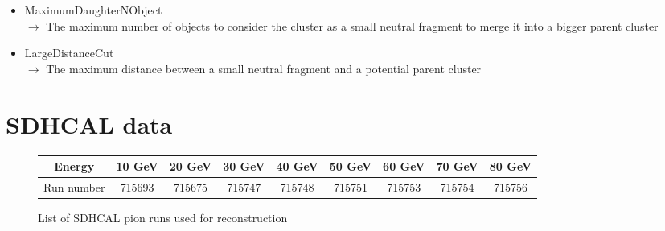 \documentclass[cits]{JINST}
\begin{document}
\begin{itemize}
  \item MaximumDaughterNObject \\
  $\rightarrow$ The maximum number of objects to consider the cluster as a small neutral fragment to merge it into a bigger parent cluster
  \item LargeDistanceCut \\
  $\rightarrow$ The maximum distance between a small neutral fragment and a potential parent cluster
\end{itemize}



\newpage
\section{SDHCAL data}
\label{SDHCAL_RUN_LIST}

\begin{center}
  \begin{figure}[!h]
    \begin{tabular}{| c | c | c | c | c | c | c | c | c |}
      \hline
      Energy & 10 GeV & 20 GeV & 30 GeV & 40 GeV & 50 GeV & 60 GeV & 70 GeV & 80 GeV \\ \hline
      Run number & 715693 & 715675 & 715747 & 715748 & 715751 & 715753 & 715754 & 715756 \\ \hline
    \end{tabular}
    \caption{ List of SDHCAL pion runs used for reconstruction}
  \end{figure}
\end{center}
\end{document}

